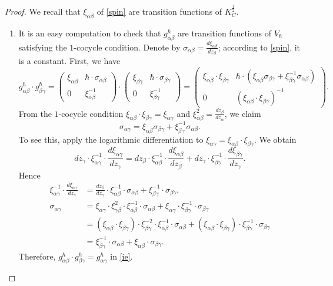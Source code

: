 \documentclass[oneside, 11pt]{amsart}
\theoremstyle{definition}
\numberwithin{equation}{subsection}
\def\a{\alpha}
\def\b{\beta}
\newcommand{\be}{\begin{equation}}
\newcommand{\ee}{\end{equation}}
\begin{document}
\begin{proof} We recall that $\xi_{\a\b}$ of \eqref{spin} are  transition functions of $K_C^{\frac{1}{2}}$.

\begin{enumerate}
\item It is an easy computation to check that $g^{\hbar}_{\a\b}$ are transition functions of $V_{\hbar}$ satisfying the $1$-cocycle condition. Denote by $\sigma_{\a\b}=\frac{d\xi_{\a\b}}{dz_{\b}}$; according to \eqref{spin}, it is a constant.
First, we have
\be \label{ie}
g^{\hbar}_{\a\b}\cdot g^{\hbar}_{\b\gamma}=\begin{pmatrix}
\xi_{\a\b}&\hbar\cdot \sigma_{\a\b}
\\ 0& \xi_{\a\b}^{-1}
\end{pmatrix} \cdot 
\begin{pmatrix}
\xi_{\b\gamma}&\hbar\cdot \sigma_{\b\gamma}
\\ 0& \xi_{\b\gamma}^{-1}
\end{pmatrix}=\begin{pmatrix}
\xi_{\a\b}\cdot\xi_{\b\gamma} 
&\hbar\cdot (\xi_{\a\b} \sigma_{\b\gamma}+ \xi_{\b\gamma}^{-1} \sigma_{\a\b})
\\ 0& (\xi_{\a\b}\cdot\xi_{\b\gamma})^{-1}
\end{pmatrix}.
\ee
From 
 the $1$-cocycle condition  $\xi_{\a\b}\cdot \xi_{\b\gamma}=\xi_{\a\gamma}$ and  $\xi_{\a\b}^2=\frac{dz_{\b}}{dz_{\a}}$,  we claim
\be \label{eu}
\sigma_{\a\gamma}=\xi_{\a\b} \sigma_{\b\gamma}+ \xi_{\b\gamma}^{-1} \sigma_{\a\b}.
\ee
To see this, apply the logarithmic differentiation to $\xi_{\a\gamma}=\xi_{\a\b}\cdot \xi_{\b\gamma}$. We obtain
$$
dz_{\gamma}\cdot \xi^{-1}_{\a\gamma}\cdot \frac{d \xi_{\a\gamma}}{dz_{\gamma}}=
dz_{\b}\cdot \xi^{-1}_{\a\b}\cdot\frac{d \xi_{\a\b}}{dz_{\b}}+dz_{\gamma}\cdot \xi^{-1}_{\b\gamma}\cdot\frac{d \xi_{\b\gamma}}{dz_{\gamma}}.$$
Hence
\begin{align*}
\xi^{-1}_{\a\gamma}\cdot \frac{d \xi_{\a\gamma}}{dz_{\gamma}}&=
\frac{dz_{\b}}{dz_{\gamma}}\cdot \xi^{-1}_{\a\b}\cdot\sigma_{\a\b}+ \xi^{-1}_{\b\gamma}\cdot\sigma_{\b\gamma},\nonumber\\
\sigma_{\a\gamma} &=
\xi_{\a\gamma}\cdot\xi_{\gamma\b}^2\cdot \xi^{-1}_{\a\b}\cdot\sigma_{\a\b}+ \xi_{\a\gamma}\cdot\xi^{-1}_{\b\gamma}\cdot\sigma_{\b\gamma}\nonumber\\
&=(\xi_{\a\b}\cdot \xi_{\b\gamma})\cdot\xi_{\b\gamma}^{-2}\cdot \xi^{-1}_{\a\b}\cdot\sigma_{\a\b}+ (\xi_{\a\b}\cdot \xi_{\b\gamma})\cdot\xi^{-1}_{\b\gamma}\cdot\sigma_{\b\gamma}\nonumber\\
 &=\xi_{\b\gamma}^{-1}\cdot\sigma_{\a\b}+ \xi_{\a\b}\cdot\sigma_{\b\gamma}.
\nonumber
\end{align*}
Therefore, $g^{\hbar}_{\a\b}\cdot g^{\hbar}_{\b\gamma}=g^{\hbar}_{\a\gamma}$ in \eqref{ie}.


\end{enumerate}
\end{proof}
\end{document}
